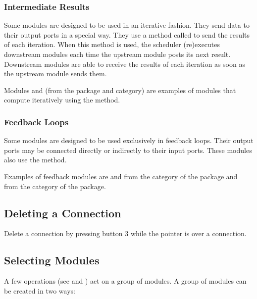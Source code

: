 \subsubsection{Intermediate Results}

Some modules are designed to be used in an iterative fashion.  They send
data to their output ports in a special way.  They use a method called
 to send the results of each iteration.  When
this method is used, the scheduler (re)executes downstream modules each time
the upstream module posts its next result.  Downstream modules are
able to receive the results of each iteration as soon as the
upstream module sends them.

Modules  and  (from the
\package{\sr} package and  category) are examples of modules
that compute iteratively using the  method.

\subsubsection{Feedback Loops}

Some modules are designed to be used exclusively in feedback loops. Their output ports may be connected
directly or indirectly to their input ports.  These modules also use the
 method.

Examples of feedback modules are  and
 from the  category of the
 package and  from the
 category of the  package.

\subsection{Deleting a Connection}
\label{sec:deleteconnections}

Delete a connection by pressing button 3 while the pointer is
over a connection.

\subsection{Selecting Modules}
\label{sec:selectmods}

A few operations (see  and
) act on a group of
modules.  A group of modules can be created in two ways:

